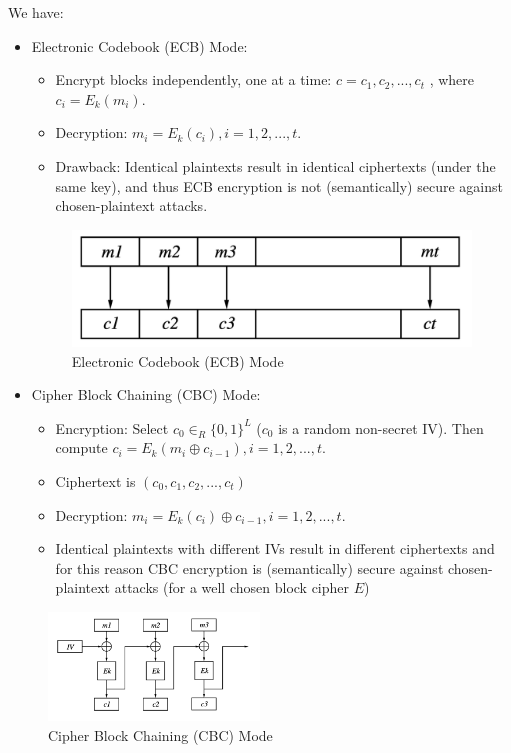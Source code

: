 \documentclass[12pt,titlepage]{article}
\begin{document}
We have: \begin{itemize}
\item Electronic Codebook (ECB) Mode: 
\begin{itemize}
	\item Encrypt blocks independently, one at a time: $c = c_1, c_2,..., c_t$ , where $c_i = E_k (m_i)$.
	\item Decryption: $m_i = E_k (c_i), i = 1, 2, ..., t$.
	\item Drawback: Identical plaintexts result in identical ciphertexts (under the same key), and thus ECB encryption is not (semantically) secure against chosen-plaintext attacks.
\end{itemize}
\begin{center}
	\begin{figure}[h!]
		\centering
		\includegraphics[width=\textwidth]{ECB.png}
		\caption{Electronic Codebook (ECB) Mode}
	\end{figure}
\end{center}
\item Cipher Block Chaining (CBC) Mode: 
\begin{itemize}
	\item Encryption: Select $c_0 \in_R \{0, 1\}^L$ ($c_0$ is a random non-secret IV). Then compute $c_i = E_k (m_i \oplus c_{i-1}), i = 1, 2, ...,t$.
	\item Ciphertext is $(c_0 , c_1 , c_2 , ..., c_t)$
	\item Decryption: $m_i = E_k (c_i) \oplus c_{i-1}, i = 1, 2,..., t$.
	\item Identical plaintexts with different IVs result in different ciphertexts and for this reason CBC encryption is (semantically) secure against chosen-plaintext attacks (for a well chosen block cipher $E$)
\end{itemize}
\end{itemize}
\begin{center}
	\begin{figure}[h!]
		\includegraphics[width=0.5\textwidth]{CBC.png}
		\caption{Cipher Block Chaining (CBC) Mode}
	\end{figure}
\end{center}
\end{document}
